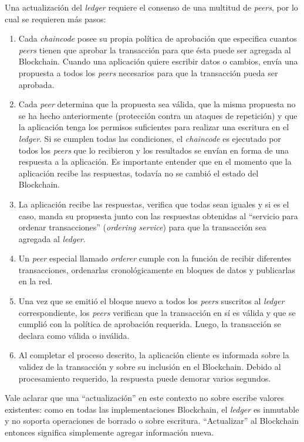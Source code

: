 Una actualización del \textit{ledger} requiere el consenso de una multitud de \textit{peers}, por lo cual se requieren más pasos:
\begin{enumerate}
    \item Cada \textit{chaincode} posee su propia política de aprobación que especifica cuantos \textit{peers}  tienen que aprobar la transacción para que ésta puede ser agregada al Blockchain. Cuando una aplicación quiere escribir datos o cambios, envía una propuesta a todos los \textit{peers}  necesarios para que la transacción pueda ser aprobada.
    \item Cada \textit{peer} determina que la propuesta sea válida, que la misma propuesta no se ha hecho anteriormente (protección contra un ataques de repetición) y que la aplicación tenga los permisos suficientes para realizar una escritura en el \textit{ledger}. Si se cumplen todas las condiciones, el \textit{chaincode} es ejecutado por todos los \textit{peers}  que lo recibieron y los resultados se envían en forma de una respuesta a la aplicación. Es importante entender que en el momento que la aplicación recibe las respuestas, todavía no se cambió el estado del Blockchain.
    \item La aplicación recibe las respuestas, verifica que todas sean iguales y si es el caso, manda su propuesta junto con las respuestas obtenidas al ``servicio para ordenar transacciones'' (\textit{ordering service}) para que la transacción sea agregada al \textit{ledger}.  
    \item Un \textit{peer} especial llamado \textit{orderer} cumple con la función de recibir diferentes transacciones, ordenarlas cronológicamente en bloques de datos y publicarlas en la red. 
    \item Una vez que se emitió el bloque nuevo a todos los \textit{peers}  suscritos al \textit{ledger} correspondiente, los \textit{peers}  verifican que la transacción en sí es válida y que se cumplió con la política de aprobación requerida. Luego, la transacción se declara como válida o inválida.
    \item Al completar el proceso descrito, la aplicación cliente es informada sobre la validez de la transacción y sobre su inclusión en el Blockchain. Debido al procesamiento requerido, la respuesta puede demorar varios segundos.
\end{enumerate} 

Vale aclarar que una ``actualización'' en este contexto no sobre escribe valores existentes: como en todas las implementaciones Blockchain, el \textit{ledger} es inmutable y no soporta operaciones de borrado o sobre escritura. ``Actualizar'' al Blockchain entonces significa simplemente agregar información nueva.

